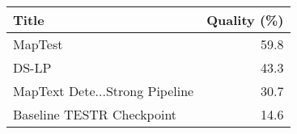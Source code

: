 \begin{tabular}{lr}
\toprule
Title & Quality (\%) \\
\midrule
MapTest & 59.8 \\
DS-LP & 43.3 \\
MapText Dete...Strong Pipeline & 30.7 \\
Baseline TESTR Checkpoint & 14.6 \\
\bottomrule
\end{tabular}

